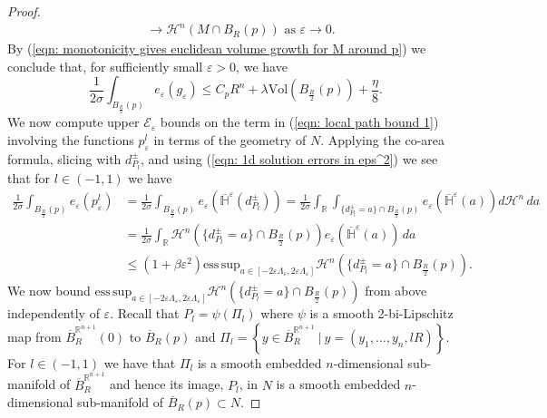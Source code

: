 \documentclass[11pt]{article}
\newcommand{\esssup}{\mathrm{ess\, sup}}
\begin{document}
\begin{proof}
\begin{align*}
    &\rightarrow \mathcal{H}^n(M \cap B_R(p)) \text{ as } \varepsilon \rightarrow 0.
\end{align*}
By (\ref{eqn: monotonicity gives euclidean volume growth for M around p}) we conclude that, for sufficiently small $\varepsilon > 0$, we have
\begin{equation}\label{eqn: local path bound 2}
   \frac{1}{2\sigma}\int_{B_{\frac{R}{2}}(p)} e_\varepsilon(g_\varepsilon)
    \leq C_pR^n + \lambda \mathrm{Vol}(B_{\frac{R}{2}}(p)) + \frac{\eta}{8}.
\end{equation}
We now compute upper $\mathcal{E}_\varepsilon$ bounds on the term in (\ref{eqn: local path bound 1}) involving the functions $p^l_\varepsilon$ in terms of the geometry of $N$. Applying the co-area formula, slicing with $d^\pm_{P_l}$, and using (\ref{eqn: 1d solution errors in eps^2}) we see that for $l \in (-1,1)$ we have
\begin{align*}
    \frac{1}{2\sigma}\int_{B_{\frac{R}{2}}(p)} e_\varepsilon(p^l_\varepsilon) &= \frac{1}{2\sigma}\int_{B_{\frac{R}{2}}(p)} e_\varepsilon(\overline{\mathbb{H}}^\varepsilon(d^\pm_{P_l})) = \frac{1}{2\sigma}\int_\mathbb{R} \int_{\{ d^\pm_{P_l} = a \} \cap B_{\frac{R}{2}}(p)} e_\varepsilon(\overline{\mathbb{H}}^\varepsilon(a)) d\mathcal{H}^n \,da\\
    &= \frac{1}{2\sigma}\int_\mathbb{R} \mathcal{H}^n(\{ d^\pm_{P_l} = a \} \cap B_{\frac{R}{2}}(p))e_\varepsilon(\overline{\mathbb{H}}^\varepsilon(a)) \,da\\
    &\leq (1 + \beta \varepsilon^2){\esssup}_{a \in [-2\varepsilon\Lambda_\varepsilon, 2\varepsilon\Lambda_\varepsilon]} \mathcal{H}^n(\{ d^\pm_{P_l} = a \} \cap B_{\frac{R}{2}}(p)).
\end{align*}
We now bound ${\esssup}_{a \in [-2\varepsilon\Lambda_\varepsilon, 2\varepsilon\Lambda_\varepsilon]} \mathcal{H}^n(\{ d^\pm_{P_l} = a \} \cap B_{\frac{R}{2}}(p))$ from above independently of $\varepsilon$. Recall that $P_l = \psi(\Pi_l)$ where $\psi$ is a smooth 2-bi-Lipschitz map from $\overline{B}_R^{\mathbb{R}^{n+1}}(0)$ to $\overline{B}_R(p)$ and $\Pi_l = \left\{y \in \overline{B}^{\mathbb{R}^{n+1}}_R \: \Big| \: y = (y_1, \dots, y_n, lR) \right\}$. For $l \in (-1,1)$ we have that $\Pi_l$ is a smooth embedded $n$-dimensional sub-manifold of $\overline{B}_R^{\mathbb{R}^{n+1}}$ and hence its image, $P_l$, in $N$ is a smooth embedded $n$-dimensional sub-manifold of $\overline{B}_R(p) \subset N$.

\bigskip


\end{proof}
\end{document}
